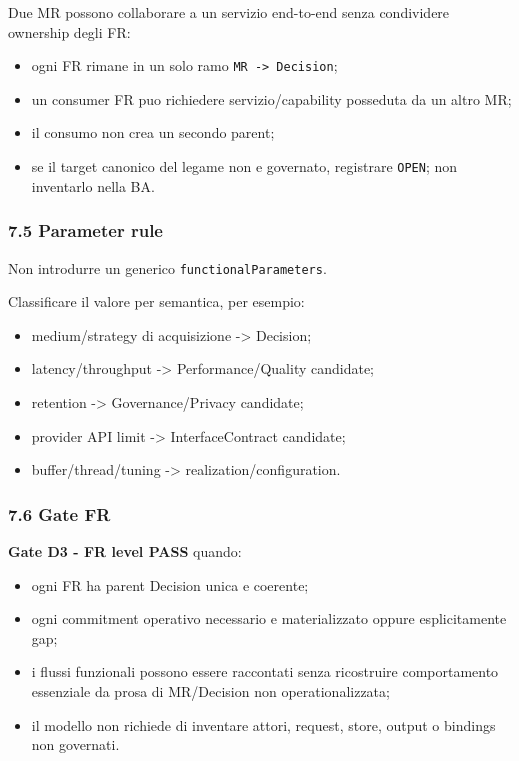\documentclass[
  9pt,
  a4paper,
]{article}
\providecommand{\tightlist}{%
  \setlength{\itemsep}{0pt}\setlength{\parskip}{0pt}}
\begin{document}
Due MR possono collaborare a un servizio end-to-end senza condividere
ownership degli FR:

\begin{itemize}
\tightlist
\item
  ogni FR rimane in un solo ramo \texttt{MR\ -\textgreater{}\ Decision};
\item
  un consumer FR puo richiedere servizio/capability posseduta da un
  altro MR;
\item
  il consumo non crea un secondo parent;
\item
  se il target canonico del legame non e governato, registrare
  \texttt{OPEN}; non inventarlo nella BA.
\end{itemize}

\subsubsection{7.5 Parameter rule}\label{parameter-rule}

Non introdurre un generico \texttt{functionalParameters}.

Classificare il valore per semantica, per esempio:

\begin{itemize}
\tightlist
\item
  medium/strategy di acquisizione -\textgreater{} Decision;
\item
  latency/throughput -\textgreater{} Performance/Quality candidate;
\item
  retention -\textgreater{} Governance/Privacy candidate;
\item
  provider API limit -\textgreater{} InterfaceContract candidate;
\item
  buffer/thread/tuning -\textgreater{} realization/configuration.
\end{itemize}

\subsubsection{7.6 Gate FR}\label{gate-fr}

\textbf{Gate D3 - FR level PASS} quando:

\begin{itemize}
\tightlist
\item
  ogni FR ha parent Decision unica e coerente;
\item
  ogni commitment operativo necessario e materializzato oppure
  esplicitamente gap;
\item
  i flussi funzionali possono essere raccontati senza ricostruire
  comportamento essenziale da prosa di MR/Decision non
  operationalizzata;
\item
  il modello non richiede di inventare attori, request, store, output o
  bindings non governati.
\end{itemize}
\end{document}
